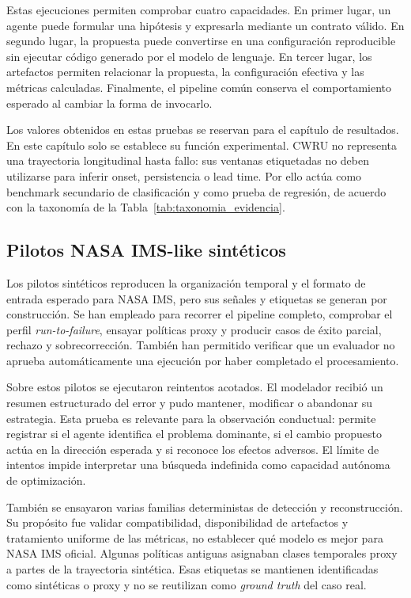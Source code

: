 Estas ejecuciones permiten comprobar cuatro capacidades. En primer lugar, un
agente puede formular una hipótesis y expresarla mediante un contrato válido.
En segundo lugar, la propuesta puede convertirse en una configuración
reproducible sin ejecutar código generado por el modelo de lenguaje. En tercer
lugar, los artefactos permiten relacionar la propuesta, la configuración
efectiva y las métricas calculadas. Finalmente, el pipeline común conserva el
comportamiento esperado al cambiar la forma de invocarlo.

Los valores obtenidos en estas pruebas se reservan para el capítulo de
resultados. En este capítulo solo se establece su función experimental. CWRU no
representa una trayectoria longitudinal hasta fallo: sus ventanas etiquetadas
no deben utilizarse para inferir onset, persistencia o lead time. Por ello actúa
como benchmark secundario de clasificación y como prueba de regresión, de
acuerdo con la taxonomía de la Tabla~\ref{tab:taxonomia_evidencia}.

\subsection{Pilotos NASA IMS-like sintéticos}

Los pilotos sintéticos reproducen la organización temporal y el formato de
entrada esperado para NASA IMS, pero sus señales y etiquetas se generan por
construcción. Se han empleado para recorrer el pipeline completo, comprobar el
perfil \textit{run-to-failure}, ensayar políticas proxy y producir casos de
éxito parcial, rechazo y sobrecorrección. También han permitido verificar que
un evaluador no aprueba automáticamente una ejecución por haber completado el
procesamiento.

Sobre estos pilotos se ejecutaron reintentos acotados. El modelador recibió un
resumen estructurado del error y pudo mantener, modificar o abandonar su
estrategia. Esta prueba es relevante para la observación conductual: permite
registrar si el agente identifica el problema dominante, si el cambio propuesto
actúa en la dirección esperada y si reconoce los efectos adversos. El límite de
intentos impide interpretar una búsqueda indefinida como capacidad autónoma de
optimización.

También se ensayaron varias familias deterministas de detección y
reconstrucción. Su propósito fue validar compatibilidad, disponibilidad de
artefactos y tratamiento uniforme de las métricas, no establecer qué modelo es
mejor para NASA IMS oficial. Algunas políticas antiguas asignaban clases
temporales proxy a partes de la trayectoria sintética. Esas etiquetas se
mantienen identificadas como sintéticas o proxy y no se reutilizan como
\textit{ground truth} del caso real.

